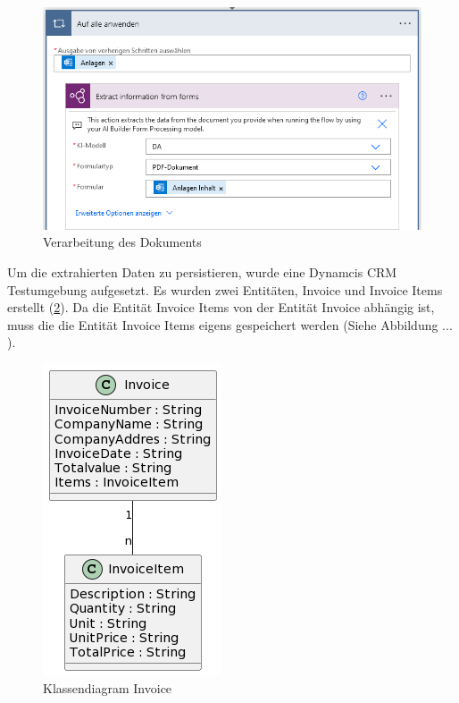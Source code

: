\begin{figure}[H]
    \centering
    \includegraphics[scale=0.8]{sections/cloud-computing/images/power-automate-flow/ai-model-in-use.png}
    \caption{Verarbeitung des Dokuments}
    \label{fig:ai-model-in-use}
\end{figure}

Um die extrahierten Daten zu persistieren, wurde eine Dynamcis CRM Testumgebung aufgesetzt. Es wurden zwei Entitäten, Invoice und Invoice Items erstellt (\ref{fig:class-diagram}). Da die Entität Invoice Items von der Entität Invoice abhängig ist, muss die die Entität Invoice Items eigens gespeichert werden (Siehe Abbildung ... ).

\begin{figure}[h]
    \centering
    \includegraphics[scale=0.5]{sections/cloud-computing/images/power-automate-flow/cld.png}
    \caption{Klassendiagram Invoice}
    \label{fig:class-diagram}
\end{figure}

